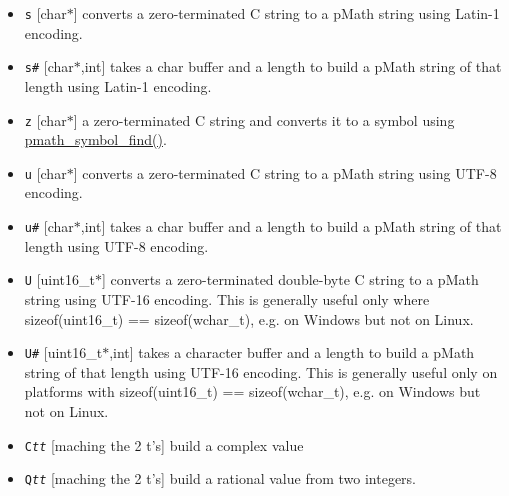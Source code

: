 \begin{itemize}
\item {\tt s} \mbox{[}char$\ast$\mbox{]} converts a zero-terminated C string to a pMath string using Latin-1 encoding.\end{itemize}


\begin{itemize}
\item {\tt s\#} \mbox{[}char$\ast$,int\mbox{]} takes a char buffer and a length to build a pMath string of that length using Latin-1 encoding.\end{itemize}


\begin{itemize}
\item {\tt z} \mbox{[}char$\ast$\mbox{]} a zero-terminated C string and converts it to a symbol using \hyperlink{group__symbols_g597a971f788584cac3f327f1afdd5f41}{pmath\_\-symbol\_\-find()}.\end{itemize}


\begin{itemize}
\item {\tt u} \mbox{[}char$\ast$\mbox{]} converts a zero-terminated C string to a pMath string using UTF-8 encoding.\end{itemize}


\begin{itemize}
\item {\tt u\#} \mbox{[}char$\ast$,int\mbox{]} takes a char buffer and a length to build a pMath string of that length using UTF-8 encoding.\end{itemize}


\begin{itemize}
\item {\tt U} \mbox{[}uint16\_\-t$\ast$\mbox{]} converts a zero-terminated double-byte C string to a pMath string using UTF-16 encoding. This is generally useful only where sizeof(uint16\_\-t) == sizeof(wchar\_\-t), e.g. on Windows but not on Linux.\end{itemize}


\begin{itemize}
\item {\tt U\#} \mbox{[}uint16\_\-t$\ast$,int\mbox{]} takes a character buffer and a length to build a pMath string of that length using UTF-16 encoding. This is generally useful only on platforms with sizeof(uint16\_\-t) == sizeof(wchar\_\-t), e.g. on Windows but not on Linux.\end{itemize}


\begin{itemize}
\item {\tt C{\em tt\/}} \mbox{[}maching the 2 t's\mbox{]} build a complex value\item {\tt Q{\em tt\/}} \mbox{[}maching the 2 t's\mbox{]} build a rational value from two integers.\end{itemize}


